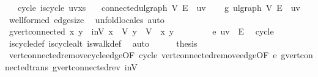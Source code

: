 \begin{isabellebody}
\ \ \ cycle{\isacharcolon}{\kern0pt}\ {\isachardoublequoteopen}is{\isacharunderscore}{\kern0pt}cycle{}\ {\isacharparenleft}{\kern0pt}u{\isacharhash}{\kern0pt}v{\isacharhash}{\kern0pt}xs{\isacharparenright}{\kern0pt}{\isachardoublequoteclose}\isanewline
\ \ \ {\isachardoublequoteopen}connected{\isacharunderscore}{\kern0pt}ulgraph\ V\ {\isacharparenleft}{\kern0pt}E\ {\isacharminus}{\kern0pt}\ {\isacharbraceleft}{\kern0pt}{\isacharbraceleft}{\kern0pt}u{\isacharcomma}{\kern0pt}v{\isacharbraceright}{\kern0pt}{\isacharbraceright}{\kern0pt}{\isacharparenright}{\kern0pt}{\isachardoublequoteclose}\isanewline
%
\isadelimproof
%
\endisadelimproof
%
\isatagproof
{}\isamarkupfalse%
{\isacharminus}{\kern0pt}\isanewline
\ \ \isamarkupfalse%
\ g{\isacharprime}{\kern0pt}{\isacharcolon}{\kern0pt}\ ulgraph\ V\ {\isachardoublequoteopen}E\ {\isacharminus}{\kern0pt}\ {\isacharbraceleft}{\kern0pt}{\isacharbraceleft}{\kern0pt}u{\isacharcomma}{\kern0pt}v{\isacharbraceright}{\kern0pt}{\isacharbraceright}{\kern0pt}{\isachardoublequoteclose}\ \isamarkupfalse%
\ wellformed\ edge{\isacharunderscore}{\kern0pt}size\ \isamarkupfalse%
\ {\isacharparenleft}{\kern0pt}unfold{\isacharunderscore}{\kern0pt}locales{\isacharcomma}{\kern0pt}\ auto{\isacharparenright}{\kern0pt}\isanewline
\ \ \isamarkupfalse%
\ {\isachardoublequoteopen}g{\isacharprime}{\kern0pt}{\isachardot}{\kern0pt}vert{\isacharunderscore}{\kern0pt}connected\ x\ y{\isachardoublequoteclose}\ \ inV{\isacharcolon}{\kern0pt}\ {\isachardoublequoteopen}x\ {\isasymin}\ V{\isachardoublequoteclose}\ {\isachardoublequoteopen}y\ {\isasymin}\ V{\isachardoublequoteclose}\ \ x\ y\isanewline
\ \ \isamarkupfalse%
{\isacharminus}{\kern0pt}\isanewline
\ \ \ \ \isamarkupfalse%
\ e{\isacharcolon}{\kern0pt}\ {\isachardoublequoteopen}{\isacharbraceleft}{\kern0pt}u{\isacharcomma}{\kern0pt}v{\isacharbraceright}{\kern0pt}\ {\isasymin}\ E{\isachardoublequoteclose}\ \isamarkupfalse%
\ cycle\ \isamarkupfalse%
\ is{\isacharunderscore}{\kern0pt}cycle{}{\isacharunderscore}{\kern0pt}def\ is{\isacharunderscore}{\kern0pt}cycle{\isacharunderscore}{\kern0pt}alt\ is{\isacharunderscore}{\kern0pt}walk{\isacharunderscore}{\kern0pt}def\ \isamarkupfalse%
\ auto\isanewline
\ \ \ \ \isamarkupfalse%
\ {\isacharquery}{\kern0pt}thesis\ \isamarkupfalse%
\ vert{\isacharunderscore}{\kern0pt}connected{\isacharunderscore}{\kern0pt}remove{\isacharunderscore}{\kern0pt}cycle{\isacharunderscore}{\kern0pt}edge{\isacharbrackleft}{\kern0pt}OF\ cycle{\isacharbrackright}{\kern0pt}\ vert{\isacharunderscore}{\kern0pt}connected{\isacharunderscore}{\kern0pt}remove{\isacharunderscore}{\kern0pt}edge{\isacharbrackleft}{\kern0pt}OF\ e{\isacharbrackright}{\kern0pt}\ g{\isacharprime}{\kern0pt}{\isachardot}{\kern0pt}vert{\isacharunderscore}{\kern0pt}connected{\isacharunderscore}{\kern0pt}trans\ g{\isacharprime}{\kern0pt}{\isachardot}{\kern0pt}vert{\isacharunderscore}{\kern0pt}connected{\isacharunderscore}{\kern0pt}rev\ inV\ \isamarkupfalse%

\end{isabellebody}
